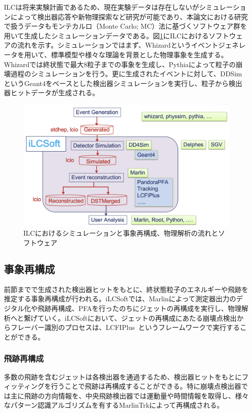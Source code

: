 ILCは将来実験計画であるため、現在実験データは存在しないがシミュレーションによって検出器応答や新物理探索など研究が可能であり、本論文における研究で扱うデータもモンテカルロ（Monte Carlo; MC）法に基づくソフトウェア群を用いて生成したシミュレーションデータである。図\ref{ilcsoft}にILCにおけるソフトウェアの流れを示す。シミュレーションではまず、Whizard\cite{whizard}というイベントジェネレータを用いて、標準模型や様々な理論を背景とした物理事象を生成する。Whizardでは終状態で最大8粒子までの事象を生成し、Pythia\cite{pythia}によって粒子の崩壊過程のシミュレーションを行う。更に生成されたイベントに対して、DDSimというGeant4\cite{geant4}をベースとした検出器シミュレーションを実行し、粒子から検出器ヒットデータが生成される。
\begin{figure}[h]
	\begin{center}
 \includegraphics[keepaspectratio, scale=0.25]
 	{Figure/Introduction/ilcsoft.png}
 		\caption {ILCにおけるシミュレーションと事象再構成、物理解析の流れとソフトウェア\cite{ilcsoftslide}}
 		\label{ilcsoft}
	\end{center}
\end{figure}

\subsection{事象再構成}
前節までで生成された検出器ヒットをもとに、終状態粒子のエネルギーや飛跡を推定する事象再構成が行われる。iLCSoftでは、Marlinによって測定器出力のデジタル化や飛跡再構成、PFAを行ったのちにジェットの再構成を実行し、物理解析へと繋げていく。iLCSoftにおいて、ジェットの再構成にあたる崩壊点検出からフレーバー識別のプロセスは、LCFIPlus~\cite{lcfiplus}というフレームワークで実行することができる。

\subsubsection{飛跡再構成}
多数の飛跡を含むジェットは各検出器を通過するため、検出器ヒットをもとにフィッティングを行うことで飛跡は再構成することができる。特に崩壊点検出器では主に飛跡の方向情報を、中央飛跡検出器では運動量や時間情報を取得し、様々なパターン認識アルゴリズムを有するMarlinTrkによって再構成される。

